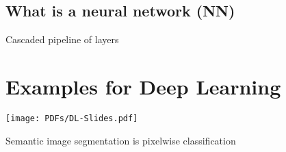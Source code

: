 \subsection{What is a neural network (NN)}

\textbullet Cascaded pipeline of layers \\
\section{Examples for Deep Learning}
\texttt{[image: PDFs/DL-Slides.pdf]}

\textbullet Semantic image segmentation is pixelwise classification



